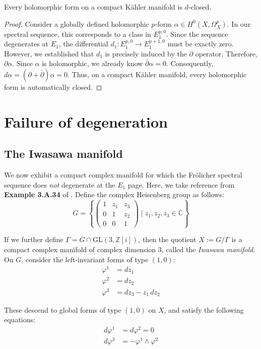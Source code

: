 \documentclass[11pt]{article}
\newcommand{\C}{\mathbb{C}}
\newcommand{\Z}{\mathbb{Z}}
\theoremstyle{definition}
\numberwithin{theorem}{section} %
\numberwithin{equation}{section} %
\begin{document}
\begin{corollary}
    Every holomorphic form on a compact K\"ahler manifold is $d$-closed.
\end{corollary}

\begin{proof}
    Consider a globally defined holomorphic $p$-form $\alpha \in H^0\left(X, \Omega_X^p\right)$. In our spectral sequence, this corresponds to a class in $E_1^{p,0}$. Since the sequence degenerates at $E_1$, the differential $d_1: E_1^{p,0} \to E_1^{p+1, 0}$ must be exactly zero. However, we established that $d_1$ is precisely induced by the $\partial$ operator. Therefore, $\partial \alpha$. Since $\alpha$ is holomorphic, we already know $\bar\partial \alpha =0$. Consequently, $d\alpha = (\partial + \bar{\partial})\alpha = 0$. Thus, on a compact K\"ahler manifold, every holomorphic form is automatically closed.
\end{proof}

\section{Failure of degeneration}
\subsection{The Iwasawa manifold}

We now exhibit a compact complex manifold for which the Fr\"olicher spectral sequence does \emph{not}
degenerate at the $E_1$ page. Here, we take reference from \textbf{Example 3.A.34} of \cite{Huybrechts2005}. Define the complex Heisenberg group as follows:
$$
G=\left\{ \begin{pmatrix}
1 & z_1 & z_3\\ 0 & 1 & z_2\\ 0 & 0 & 1\end{pmatrix} \mid z_1,z_2,z_3\in\C \right\}
$$

\noindent If we further define $\Gamma = G\cap \mathrm{GL}(3,\Z[i])$, then the quotient $X:=G/\Gamma$ is a compact complex manifold of complex dimension $3$, called the \emph{Iwasawa manifold}. On $G$, consider the left-invariant forms of type $(1,0)$:
\begin{align*}
\varphi^1 &= dz_1\\
\varphi^2 &= dz_2\\
\varphi^3 &= dz_3 - z_1 \,dz_2
\end{align*}

\noindent These descend to global forms of type $(1,0)$ on $X$, and satisfy the following equations:
\begin{align*}
d\varphi^1 &= d\varphi^2 = 0 \\
d\varphi^3 &= -\varphi^1\wedge \varphi^2
\end{align*}
\end{document}
